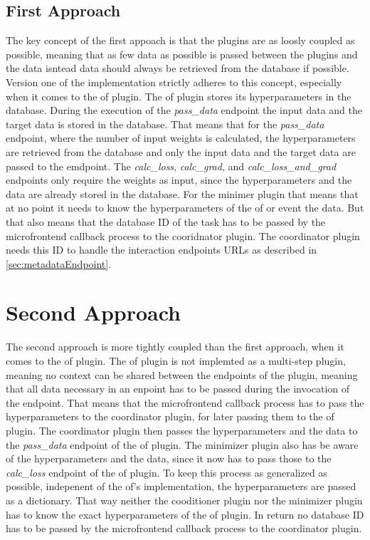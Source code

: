 \documentclass[
  a4paper,  %
  twoside,  %
  bibliography=totoc,
  headsepline,
  cleardoublepage=empty,
  parskip=half,
  draft=false
]{scrbook}
\begin{document}
\subsection{First Approach}
\label{sec:firstApproach}
The key concept of the first appoach is that the plugins are as loosly coupled as possible, meaning that as few data as possible is passed between the plugins and the data isntead data should always be retrieved from the database if possible.
Version one of the implementation strictly adheres to this concept, especially when it comes to the \gls{of} plugin.
The \gls{of} plugin stores its hyperparameters in the database.
During the execution of the \emph{pass\_data} endpoint the input data and the target data is stored in the database.
That means that for the \emph{pass\_data} endpoint, where the number of input weights is calculated, the hyperparameters are retrieved from the database and only the input data and the target data are passed to the emdpoint.
The \emph{calc\_loss}, \emph{calc\_grad}, and \emph{calc\_loss\_and\_grad} endpoints only require the weights as input, since the hyperparameters and the data are already stored in the database.
For the minimer plugin that means that at no point it needs to know the hyperparameters of the \gls{of} or event the data.
But that also means that the database ID of the task has to be passed by the microfrontend callback process to the cooridnator plugin.
The coordinator plugin needs this ID to handle the interaction endpoints URLs as described in \ref{sec:metadataEndpoint}.

\section{Second Approach}
\label{sec:secondApproach}
The second approach is more tightly coupled than the first approach, when it comes to the \gls{of} plugin.
The \gls{of} plugin is not implemted as a multi-step plugin, meaning no context can be shared between the endpoints of the plugin, meaning that all data necessary in an enpoint has to be passed during the invocation of the endpoint.
That means that the microfrontend callback process has to pass the hyperparameters to the coordinator plugin, for later passing them to the \gls{of} plugin.
The coordinator plugin then passes the hyperparameters and the data to the \emph{pass\_data} endpoint of the \gls{of} plugin.
The minimizer plugin also has be aware of the hyperparameters and the data, since it now has to pass those to the \emph{calc\_loss} endpoint of the \gls{of} plugin.
To keep this process as generalized as possible, indepenent of the \gls{of}'s implementation, the hyperparameters are passed as a dictionary.
That way neither the cooditioner plugin nor the minimizer plugin has to know the exact hyperparameters of the \gls{of} plugin.
In return no database ID has to be passed by the microfrontend callback process to the coordinator plugin.
\end{document}
